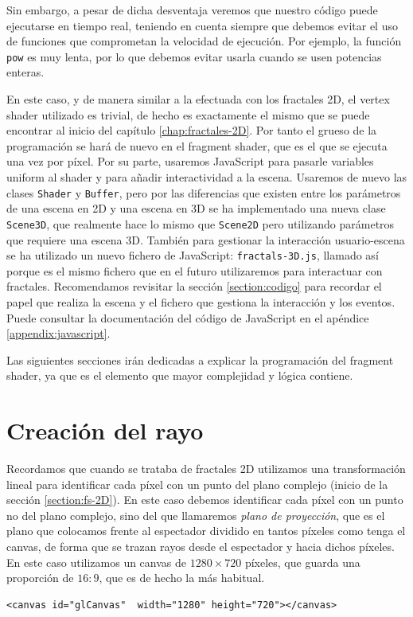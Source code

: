 Sin embargo, a pesar de dicha desventaja veremos que nuestro código puede ejecutarse en tiempo real, teniendo en cuenta siempre que debemos evitar el uso de funciones que comprometan la velocidad de ejecución. Por ejemplo, la función \verb|pow| es muy lenta, por lo que debemos evitar usarla cuando se usen potencias enteras.

En este caso, y de manera similar a la efectuada con los fractales 2D, el vertex shader utilizado es trivial, de hecho es exactamente el mismo que se puede encontrar al inicio del capítulo \ref{chap:fractales-2D}. Por tanto el grueso de la programación se hará de nuevo en el fragment shader, que es el que se ejecuta una vez por píxel. Por su parte, usaremos JavaScript para pasarle variables uniform al shader y para añadir interactividad a la escena. Usaremos de nuevo las clases \verb|Shader| y \verb|Buffer|, pero por las diferencias que existen entre los parámetros de una escena en 2D y una escena en 3D se ha implementado una nueva clase \verb|Scene3D|, que realmente hace lo mismo que \verb|Scene2D| pero utilizando parámetros que requiere una escena 3D. También para gestionar la interacción usuario-escena se ha utilizado un nuevo fichero de JavaScript: \verb|fractals-3D.js|, llamado así porque es el mismo fichero que en el futuro utilizaremos para interactuar con fractales. Recomendamos revisitar la sección \ref{section:codigo} para recordar el papel que realiza la escena y el fichero que gestiona la interacción y los eventos. Puede consultar la documentación del código de JavaScript en el apéndice \ref{appendix:javascript}.

Las siguientes secciones irán dedicadas a explicar la programación del fragment shader, ya que es el elemento que mayor complejidad y lógica contiene.

\section{Creación del rayo}
\label{section:rayo}

Recordamos que cuando se trataba de fractales 2D utilizamos una transformación lineal para identificar cada píxel con un punto del plano complejo (inicio de la sección \ref{section:fs-2D}). En este caso debemos identificar cada píxel con un punto no del plano complejo, sino del que llamaremos \textit{plano de proyección}, que es el plano que colocamos frente al espectador dividido en tantos píxeles como tenga el canvas, de forma que se trazan rayos desde el espectador y hacia dichos píxeles. En este caso utilizamos un canvas de $1280\times 720$ píxeles, que guarda una proporción de $16:9$, que es de hecho la más habitual.
\begin{lstlisting}
<canvas id="glCanvas"  width="1280" height="720"></canvas>
\end{lstlisting}

